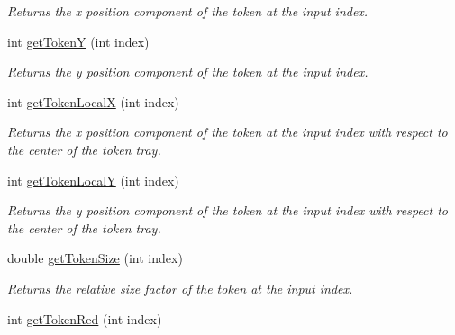 \begin{DoxyCompactItemize}
\begin{DoxyCompactList}\small\item\em Returns the x position component of the token at the input index. \end{DoxyCompactList}\item 
\hypertarget{class_picto_1_1_token_tray_graphic_a4a28a2709d61f5c08fbdd6c40025acbb}{int \hyperlink{class_picto_1_1_token_tray_graphic_a4a28a2709d61f5c08fbdd6c40025acbb}{get\-Token\-Y} (int index)}\label{class_picto_1_1_token_tray_graphic_a4a28a2709d61f5c08fbdd6c40025acbb}

\begin{DoxyCompactList}\small\item\em Returns the y position component of the token at the input index. \end{DoxyCompactList}\item 
\hypertarget{class_picto_1_1_token_tray_graphic_ac795155c8c9b6a2321d9c4ba9cfe35a5}{int \hyperlink{class_picto_1_1_token_tray_graphic_ac795155c8c9b6a2321d9c4ba9cfe35a5}{get\-Token\-Local\-X} (int index)}\label{class_picto_1_1_token_tray_graphic_ac795155c8c9b6a2321d9c4ba9cfe35a5}

\begin{DoxyCompactList}\small\item\em Returns the x position component of the token at the input index with respect to the center of the token tray. \end{DoxyCompactList}\item 
\hypertarget{class_picto_1_1_token_tray_graphic_aa2475ff159e278b5ec6f2a709bd88229}{int \hyperlink{class_picto_1_1_token_tray_graphic_aa2475ff159e278b5ec6f2a709bd88229}{get\-Token\-Local\-Y} (int index)}\label{class_picto_1_1_token_tray_graphic_aa2475ff159e278b5ec6f2a709bd88229}

\begin{DoxyCompactList}\small\item\em Returns the y position component of the token at the input index with respect to the center of the token tray. \end{DoxyCompactList}\item 
\hypertarget{class_picto_1_1_token_tray_graphic_ab3dca418abc9c597f205ba4214319787}{double \hyperlink{class_picto_1_1_token_tray_graphic_ab3dca418abc9c597f205ba4214319787}{get\-Token\-Size} (int index)}\label{class_picto_1_1_token_tray_graphic_ab3dca418abc9c597f205ba4214319787}

\begin{DoxyCompactList}\small\item\em Returns the relative size factor of the token at the input index. \end{DoxyCompactList}\item 
\hypertarget{class_picto_1_1_token_tray_graphic_aa6994c33d487599c135d3ab933a63ba9}{int \hyperlink{class_picto_1_1_token_tray_graphic_aa6994c33d487599c135d3ab933a63ba9}{get\-Token\-Red} (int index)}\label{class_picto_1_1_token_tray_graphic_aa6994c33d487599c135d3ab933a63ba9}


\end{DoxyCompactItemize}
